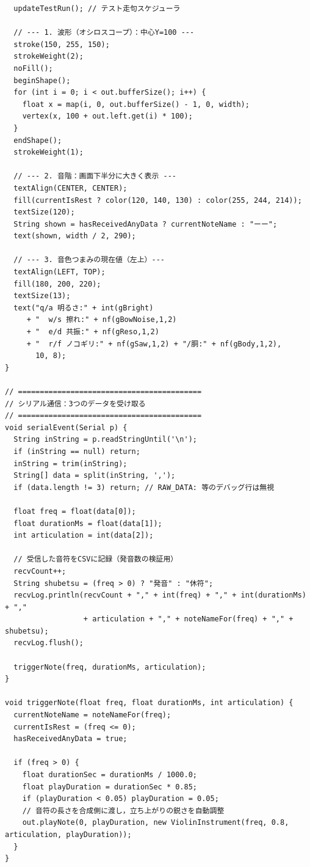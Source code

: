 \begin{lstlisting}
  updateTestRun(); // テスト走句スケジューラ

  // --- 1. 波形（オシロスコープ）：中心Y=100 ---
  stroke(150, 255, 150);
  strokeWeight(2);
  noFill();
  beginShape();
  for (int i = 0; i < out.bufferSize(); i++) {
    float x = map(i, 0, out.bufferSize() - 1, 0, width);
    vertex(x, 100 + out.left.get(i) * 100);
  }
  endShape();
  strokeWeight(1);

  // --- 2. 音階：画面下半分に大きく表示 ---
  textAlign(CENTER, CENTER);
  fill(currentIsRest ? color(120, 140, 130) : color(255, 244, 214));
  textSize(120);
  String shown = hasReceivedAnyData ? currentNoteName : "ーー";
  text(shown, width / 2, 290);

  // --- 3. 音色つまみの現在値（左上）---
  textAlign(LEFT, TOP);
  fill(180, 200, 220);
  textSize(13);
  text("q/a 明るさ:" + int(gBright)
     + "  w/s 擦れ:" + nf(gBowNoise,1,2)
     + "  e/d 共振:" + nf(gReso,1,2)
     + "  r/f ノコギリ:" + nf(gSaw,1,2) + "/胴:" + nf(gBody,1,2),
       10, 8);
}

// ==========================================
// シリアル通信：3つのデータを受け取る
// ==========================================
void serialEvent(Serial p) {
  String inString = p.readStringUntil('\n');
  if (inString == null) return;
  inString = trim(inString);
  String[] data = split(inString, ',');
  if (data.length != 3) return; // RAW_DATA: 等のデバッグ行は無視

  float freq = float(data[0]);
  float durationMs = float(data[1]);
  int articulation = int(data[2]);

  // 受信した音符をCSVに記録（発音数の検証用）
  recvCount++;
  String shubetsu = (freq > 0) ? "発音" : "休符";
  recvLog.println(recvCount + "," + int(freq) + "," + int(durationMs) + ","
                  + articulation + "," + noteNameFor(freq) + "," + shubetsu);
  recvLog.flush();

  triggerNote(freq, durationMs, articulation);
}

void triggerNote(float freq, float durationMs, int articulation) {
  currentNoteName = noteNameFor(freq);
  currentIsRest = (freq <= 0);
  hasReceivedAnyData = true;

  if (freq > 0) {
    float durationSec = durationMs / 1000.0;
    float playDuration = durationSec * 0.85;
    if (playDuration < 0.05) playDuration = 0.05;
    // 音符の長さを合成側に渡し，立ち上がりの鋭さを自動調整
    out.playNote(0, playDuration, new ViolinInstrument(freq, 0.8, articulation, playDuration));
  }
}


\end{lstlisting}
